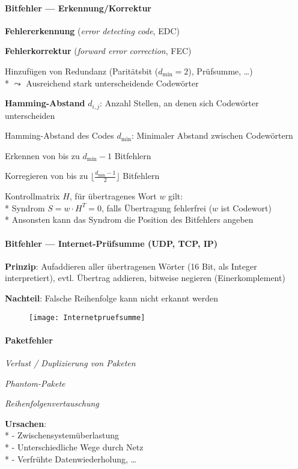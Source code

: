 \paragraph{Bitfehler --- Erkennung/Korrektur}
\newcommand{\dmin}{\ensuremath{d_{\min}}}
\begin{items}
	\item \textbf{Fehlererkennung} (\emph{error detecting code}, EDC)
	\item \textbf{Fehlerkorrektur} (\emph{forward error correction}, FEC)
	\item Hinzufügen von Redundanz (Paritätsbit ($\dmin = 2$), Prüfsumme, \dots)\\*
		\( \leadsto \) Ausreichend stark unterscheidende Codewörter 
	\item \textbf{Hamming-Abstand} $d_{i,j}$: Anzahl Stellen, an denen sich Codewörter unterscheiden
	\item Hamming-Abstand des Codes $\dmin$: Minimaler Abstand zwischen Codewörtern
	\item Erkennen von bis zu $\dmin - 1 $ Bitfehlern
	\item Korregieren von bis zu $\lfloor \frac{\dmin - 1}{2} \rfloor$ Bitfehlern
	\item Kontrollmatrix $H$, für übertragenes Wort $w$ gilt: \\*
		Syndrom $S = w \cdot H^T = 0$, falls Übertragung fehlerfrei ($w$ ist Codewort)\\*
		Ansonsten kann das Syndrom die Position des Bitfehlers angeben
\end{items}

\paragraph{Bitfehler --- Internet-Prüfsumme (UDP, TCP, IP)}
\begin{items}
  \item \textbf{Prinzip}: Aufaddieren aller übertragenen Wörter (16 Bit, als Integer interpretiert), evtl. Übertrag addieren, bitweise negieren (Einerkomplement)
  \item \textbf{Nachteil}: Falsche Reihenfolge kann nicht erkannt werden
\end{items}
\begin{figure}[H]\centering\label{Internetpruefsumme}\texttt{[image: Internetpruefsumme]}\end{figure}

\paragraph{Paketfehler}
\begin{items}
	\item \emph{Verlust / Duplizierung von Paketen}
	\item \emph{Phantom-Pakete}
	\item \emph{Reihenfolgenvertauschung}
	\item \textbf{Ursachen}: \\*
	- Zwischensystemüberlastung \\*
	- Unterschiedliche Wege durch Netz \\*
	- Verfrühte Datenwiederholung, \dots
\end{items}

